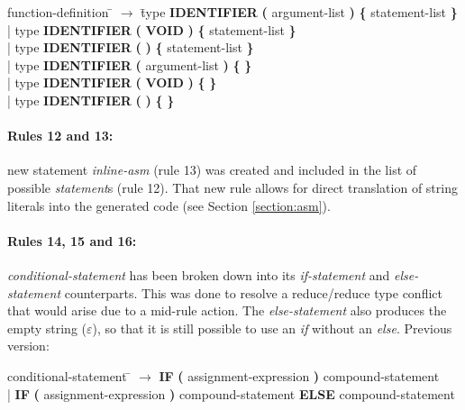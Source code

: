 \begin{tabbing} function-definition \= $\rightarrow$ \= type \textbf{IDENTIFIER} \textbf{(} argument-list \textbf{)} \textbf{\{} statement-list \textbf{\}}   \\
	\> \hspace*{0.05cm} 	|\>  type \textbf{IDENTIFIER} \textbf{(} \textbf{VOID} \textbf{)}          \textbf{\{} statement-list \textbf{\}}   \\
	\> \hspace*{0.05cm} 	|\>  type \textbf{IDENTIFIER} \textbf{(} \textbf{)}               \textbf{\{} statement-list \textbf{\}}   \\
	\> \hspace*{0.05cm} 	|\>  type \textbf{IDENTIFIER} \textbf{(} argument-list \textbf{)} \textbf{\{}                \textbf{\}}   \\
	\> \hspace*{0.05cm} 	|\>  type \textbf{IDENTIFIER} \textbf{(} \textbf{VOID} \textbf{)}          \textbf{\{}                \textbf{\}}   \\
	\> \hspace*{0.05cm} 	|\>  type \textbf{IDENTIFIER} \textbf{(} \textbf{)}               \textbf{\{}                \textbf{\}}   \\
\end{tabbing}

\paragraph{Rules 12 and 13:} new statement \textit{inline-asm} (rule 13) was created and
included in the list of possible \textit{statement}s (rule 12). That new rule allows for
direct translation of string literals into the generated code (see Section \ref{section:asm}).

\paragraph{Rules 14, 15 and 16:} \textit{conditional-statement} has been broken down into its
\textit{if-statement} and \textit{else-statement} counterparts. This was done to resolve a
reduce/reduce type conflict that would arise due to a mid-rule action. The \textit{else-statement}
also produces the empty string ($\varepsilon$), so that it is still possible to use an \textit{if}
without an \textit{else}. Previous version:

\begin{tabbing} conditional-statement \= $\rightarrow$ \= \textbf{IF} \textbf{(} assignment-expression \textbf{)} compound-statement \\
	\> \hspace*{0.05cm} | \> \textbf{IF} \textbf{(} assignment-expression \textbf{)} compound-statement \textbf{ELSE} compound-statement \\
\end{tabbing}

